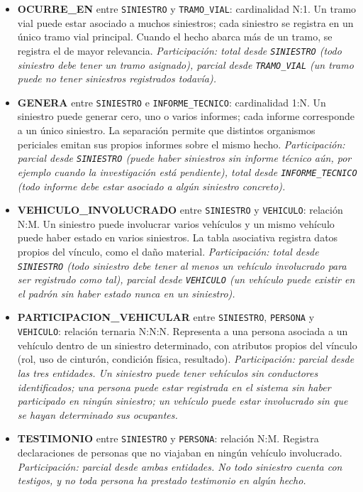 \documentclass[12pt,a4paper]{article}
\begin{document}
\begin{itemize}[leftmargin=*]
    \item \textbf{OCURRE\_EN} entre \texttt{SINIESTRO} y \texttt{TRAMO\_VIAL}: cardinalidad N:1. Un tramo vial puede estar asociado a muchos siniestros; cada siniestro se registra en un único tramo vial principal. Cuando el hecho abarca más de un tramo, se registra el de mayor relevancia. \emph{Participación: total desde \texttt{SINIESTRO} (todo siniestro debe tener un tramo asignado), parcial desde \texttt{TRAMO\_VIAL} (un tramo puede no tener siniestros registrados todavía).}

    \item \textbf{GENERA} entre \texttt{SINIESTRO} e \texttt{INFORME\_TECNICO}: cardinalidad 1:N. Un siniestro puede generar cero, uno o varios informes; cada informe corresponde a un único siniestro. La separación permite que distintos organismos periciales emitan sus propios informes sobre el mismo hecho. \emph{Participación: parcial desde \texttt{SINIESTRO} (puede haber siniestros sin informe técnico aún, por ejemplo cuando la investigación está pendiente), total desde \texttt{INFORME\_TECNICO} (todo informe debe estar asociado a algún siniestro concreto).}

    \item \textbf{VEHICULO\_INVOLUCRADO} entre \texttt{SINIESTRO} y \texttt{VEHICULO}: relación N:M. Un siniestro puede involucrar varios vehículos y un mismo vehículo puede haber estado en varios siniestros. La tabla asociativa registra datos propios del vínculo, como el daño material. \emph{Participación: total desde \texttt{SINIESTRO} (todo siniestro debe tener al menos un vehículo involucrado para ser registrado como tal), parcial desde \texttt{VEHICULO} (un vehículo puede existir en el padrón sin haber estado nunca en un siniestro).}

    \item \textbf{PARTICIPACION\_VEHICULAR} entre \texttt{SINIESTRO}, \texttt{PERSONA} y \texttt{VEHICULO}: relación ternaria N:N:N. Representa a una persona asociada a un vehículo dentro de un siniestro determinado, con atributos propios del vínculo (rol, uso de cinturón, condición física, resultado). \emph{Participación: parcial desde las tres entidades. Un siniestro puede tener vehículos sin conductores identificados; una persona puede estar registrada en el sistema sin haber participado en ningún siniestro; un vehículo puede estar involucrado sin que se hayan determinado sus ocupantes.}

    \item \textbf{TESTIMONIO} entre \texttt{SINIESTRO} y \texttt{PERSONA}: relación N:M. Registra declaraciones de personas que no viajaban en ningún vehículo involucrado. \emph{Participación: parcial desde ambas entidades. No todo siniestro cuenta con testigos, y no toda persona ha prestado testimonio en algún hecho.}


\end{itemize}
\end{document}
